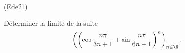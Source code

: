 \begin{tiny}(Ede21)\end{tiny} D{\'e}terminer la limite de la suite
\[
\left( \left( \cos \frac{n\pi }{3n+1}+\sin \frac{n\pi
}{6n+1}\right) ^{n}\right) _{n\in \N}.
\]